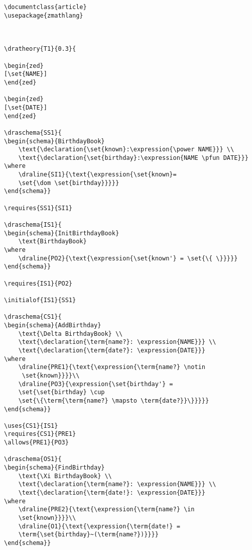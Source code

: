 \begin{verbatim}
\documentclass{article}
\usepackage{zmathlang}



\dratheory{T1}{0.3}{

\begin{zed}
[\set{NAME}] 
\end{zed}

\begin{zed}
[\set{DATE}]
\end{zed}

\draschema{SS1}{
\begin{schema}{BirthdayBook}
    \text{\declaration{\set{known}:\expression{\power NAME}}} \\
    \text{\declaration{\set{birthday}:\expression{NAME \pfun DATE}}}
\where
    \draline{SI1}{\text{\expression{\set{known}=
    \set{\dom \set{birthday}}}}}
\end{schema}}

\requires{SS1}{SI1}

\draschema{IS1}{
\begin{schema}{InitBirthdayBook}
    \text{BirthdayBook}
\where
    \draline{PO2}{\text{\expression{\set{known'} = \set{\{ \}}}}}
\end{schema}}

\requires{IS1}{PO2}

\initialof{IS1}{SS1}

\draschema{CS1}{
\begin{schema}{AddBirthday}
    \text{\Delta BirthdayBook} \\
    \text{\declaration{\term{name?}: \expression{NAME}}} \\
    \text{\declaration{\term{date?}: \expression{DATE}}}
\where
    \draline{PRE1}{\text{\expression{\term{name?} \notin
     \set{known}}}}\\
    \draline{PO3}{\expression{\set{birthday'} = 
    \set{\set{birthday} \cup 
    \set{\{\term{\term{name?} \mapsto \term{date?}}\}}}}}
\end{schema}}

\uses{CS1}{IS1}
\requires{CS1}{PRE1}
\allows{PRE1}{PO3}

\draschema{OS1}{
\begin{schema}{FindBirthday}
    \text{\Xi BirthdayBook} \\
    \text{\declaration{\term{name?}: \expression{NAME}}} \\
    \text{\declaration{\term{date!}: \expression{DATE}}}
\where
    \draline{PRE2}{\text{\expression{\term{name?} \in 
    \set{known}}}}\\
    \draline{O1}{\text{\expression{\term{date!} = 
    \term{\set{birthday}~(\term{name?})}}}}
\end{schema}}


\end{verbatim}

